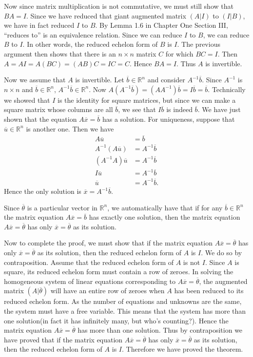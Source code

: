 \documentclass[12pt]{article}
\def\bar#1{\overline{#1}}
\def\th{\theta} \def\al{\alpha} \def\ba{\beta} \def\ga{\gamma}
\def\R{\mathbb{R}} \def\Q{\mathbb{Q}} \def\N{\mathbb{N}} \def\Z{\mathbb{Z}} \def\P{\mathbb{P}}
\begin{document}
Now since matrix multiplication is not commutative, we must still show that $BA = I$. Since we have reduced that giant augmented matrix $(A | I)$ to $(I | B)$, we have in fact reduced $I$ to $B$. By Lemma 1.6 in Chapter One Section III, ``reduces to'' is an equivalence relation. Since we can reduce $I$ to $B$, we can reduce 
$B$ to $I$. In other words, the reduced echelon form of $B$ is $I$. The previous argument then shows that there is an $n \times n$ matrix $C$ for which $BC = I$. Then $A = AI = A(BC) = (AB)C = IC = C$. Hence $BA = I$. Thus $A$ is invertible.

Now we assume that $A$ is invertible. Let $\bar{b} \in \R^n$ and consider $A^{-1}\bar{b}$. Since $A^{-1}$ is $n \times n$ and $\bar{b} \in \R^n$, $A^{-1}\bar{b} \in \R^n$. Now $A(A^{-1}\bar{b}) = (AA^{-1})\bar{b} = I\bar{b} = \bar{b}$. Technically we showed that $I$ is the identity for square matrices, but since we can make a square matrix whose columns are all $\bar{b}$, we see that $I\bar{b}$ is indeed $\bar{b}$. We have just shown that the equation $A\bar{x} = \bar{b}$ has a solution. For uniqueness, suppose that $\bar{u} \in \R^n$ is another one. Then we have
\begin{align*}
A\bar{u} &= \bar{b} \\
A^{-1}(A\bar{u}) &= A^{-1}\bar{b} \\
(A^{-1}A)\bar{u} &= A^{-1}\bar{b} \\
I\bar{u} &= A^{-1}\bar{b} \\
\bar{u} &= A^{-1}\bar{b}.
\end{align*}
Hence the only solution is $\bar{x} = A^{-1}\bar{b}$. 

Since $\bar{\th}$ is a particular vector in $\R^n$, we automatically have that if for any $\bar{b} \in \R^n$ the matrix equation $A\bar{x} = \bar{b}$ has exactly one solution, then the matrix equation $A\bar{x} = \bar{\th}$ has only $\bar{x} = \bar{\th}$ as its solution. 

Now to complete the proof, we must show that if the matrix equation $A\bar{x} = \bar{\th}$ has only $\bar{x} = \bar{\th}$ as its solution, then the reduced echelon form of $A$ is $I$. We do so by contraposition. Assume that the reduced echelon form of $A$ is not $I$. Since $A$ is square, its reduced echelon form must contain a row of zeroes. In solving the homogeneous system of linear equations corresponding to $A\bar{x} = \bar{\th}$, the augmented matrix $(A | \bar{\th})$ will have an entire row of zeroes when $A$ has been reduced to its reduced echelon form. As the number of equations and unknowns are the same, the system must have a free variable. This means that the system has more than one solution(in fact it has infinitely many, but who's counting?). Hence the matrix equation $A\bar{x} = \bar{\th}$ has more than one solution. Thus by contraposition we have proved that if the matrix equation $A\bar{x} = \bar{\th}$ has only $\bar{x} = \bar{\th}$ as its solution, then the reduced echelon form of $A$ is $I$. Therefore we have proved the theorem.
\end{document}
